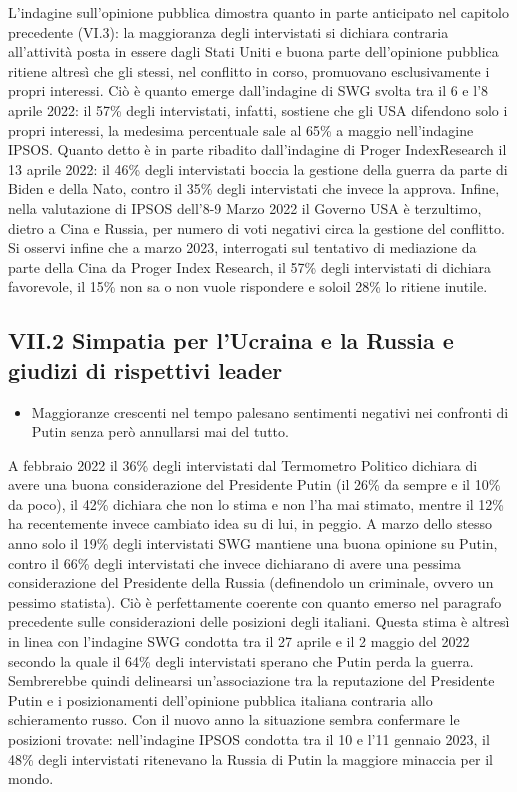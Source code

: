 \documentclass[
  openany]{book}
\providecommand{\tightlist}{%
  \setlength{\itemsep}{0pt}\setlength{\parskip}{0pt}}
\begin{document}
L'indagine sull'opinione pubblica dimostra quanto in parte anticipato nel capitolo precedente (VI.3): la maggioranza degli intervistati si dichiara contraria all'attività posta in essere dagli Stati Uniti e buona parte dell'opinione pubblica ritiene altresì che gli stessi, nel conflitto in corso, promuovano esclusivamente i propri interessi. Ciò è quanto emerge dall'indagine di SWG svolta tra il 6 e l'8 aprile 2022: il 57\% degli intervistati, infatti, sostiene che gli USA difendono solo i propri interessi, la medesima percentuale sale al 65\% a maggio nell'indagine IPSOS. Quanto detto è in parte ribadito dall'indagine di Proger IndexResearch il 13 aprile 2022: il 46\% degli intervistati boccia la gestione della guerra da parte di Biden e della Nato, contro il 35\% degli intervistati che invece la approva. Infine, nella valutazione di IPSOS dell'8-9 Marzo 2022 il Governo USA è terzultimo, dietro a Cina e Russia, per numero di voti negativi circa la gestione del conflitto. Si osservi infine che a marzo 2023, interrogati sul tentativo di mediazione da parte della Cina da Proger Index Research, il 57\% degli intervistati di dichiara favorevole, il 15\% non sa o non vuole rispondere e soloil 28\% lo ritiene inutile.

\hypertarget{vii.2-simpatia-per-lucraina-e-la-russia-e-giudizi-di-rispettivi-leader}{%
\subsection{VII.2 Simpatia per l'Ucraina e la Russia e giudizi di rispettivi leader}\label{vii.2-simpatia-per-lucraina-e-la-russia-e-giudizi-di-rispettivi-leader}}

\begin{itemize}
\tightlist
\item
  Maggioranze crescenti nel tempo palesano sentimenti negativi nei confronti di Putin senza però annullarsi mai del tutto.
\end{itemize}

A febbraio 2022 il 36\% degli intervistati dal Termometro Politico dichiara di avere una buona considerazione del Presidente Putin (il 26\% da sempre e il 10\% da poco), il 42\% dichiara che non lo stima e non l'ha mai stimato, mentre il 12\% ha recentemente invece cambiato idea su di lui, in peggio. A marzo dello stesso anno solo il 19\% degli intervistati SWG mantiene una buona opinione su Putin, contro il 66\% degli intervistati che invece dichiarano di avere una pessima considerazione del Presidente della Russia (definendolo un criminale, ovvero un pessimo statista). Ciò è perfettamente coerente con quanto emerso nel paragrafo precedente sulle considerazioni delle posizioni degli italiani. Questa stima è altresì in linea con l'indagine SWG condotta tra il 27 aprile e il 2 maggio del 2022 secondo la quale il 64\% degli intervistati sperano che Putin perda la guerra. Sembrerebbe quindi delinearsi un'associazione tra la reputazione del Presidente Putin e i posizionamenti dell'opinione pubblica italiana contraria allo schieramento russo. Con il nuovo anno la situazione sembra confermare le posizioni trovate: nell'indagine IPSOS condotta tra il 10 e l'11 gennaio 2023, il 48\% degli intervistati ritenevano la Russia di Putin la maggiore minaccia per il mondo.
\end{document}
